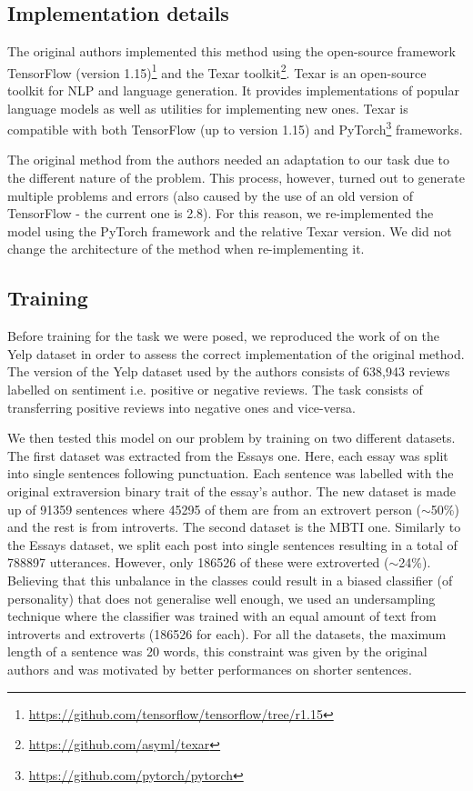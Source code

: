 \documentclass[nomenclature, english, biblatex]{kththesis}
\begin{document}
\subsection{Implementation details}
The original authors implemented this method using the open-source framework TensorFlow (version 1.15)\footnote{\url{https://github.com/tensorflow/tensorflow/tree/r1.15}} and the Texar toolkit\footnote{\url{https://github.com/asyml/texar}}. Texar is an open-source toolkit for \gls{NLP} and language generation. It provides implementations of popular language models as well as utilities for implementing new ones. Texar is compatible with both TensorFlow (up to version 1.15) and PyTorch\footnote{\url{https://github.com/pytorch/pytorch}} frameworks.

The original method from the authors needed an adaptation to our task due to the different nature of the problem. This process, however, turned out to generate multiple problems and errors (also caused by the use of an old version of TensorFlow - the current one is 2.8). For this reason, we re-implemented the model using the PyTorch framework and the relative Texar version. We did not change the architecture of the method when re-implementing it.
\subsection{Training}
\label{sec:gan_training}
Before training for the task we were posed, we reproduced the work of \textcite{yang2018unsupervised} on the Yelp dataset in order to assess the correct implementation of the original method. The version of the Yelp dataset used by the authors consists of 638,943 reviews labelled on sentiment i.e. positive or negative reviews. The task consists of transferring positive reviews into negative ones and vice-versa.

We then tested this model on our problem by training on two different datasets. The first dataset was extracted from the Essays one. Here, each essay was split into single sentences following punctuation. Each sentence was labelled with the original extraversion binary trait of the essay's author. The new dataset is made up of 91359 sentences where 45295 of them are from an extrovert person ($\sim$50\%) and the rest is from introverts. The second dataset is the MBTI one. Similarly to the Essays dataset, we split each post into single sentences resulting in a total of 788897 utterances. However, only 186526 of these were extroverted ($\sim$24\%). Believing that this unbalance in the classes could result in a biased classifier (of personality) that does not generalise well enough, we used an undersampling technique where the classifier was trained with an equal amount of text from introverts and extroverts (186526 for each). For all the datasets, the maximum length of a sentence was 20 words, this constraint was given by the original authors and was motivated by better performances on shorter sentences.
\end{document}
